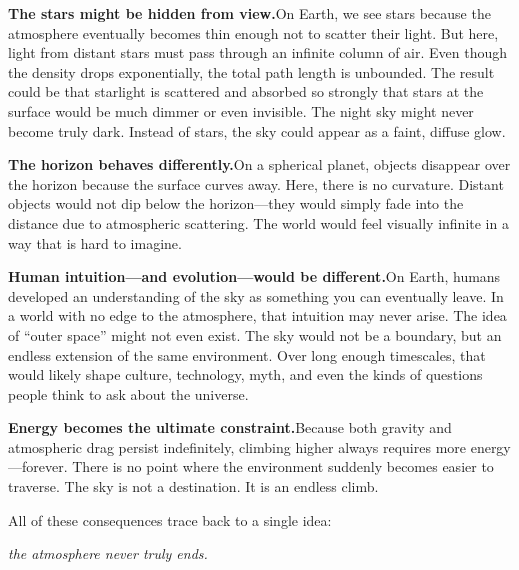 \documentclass[11pt, letterpaper]{article}
\begin{document}
\medskip

\textbf{The stars might be hidden from view.}\quad On Earth, we see stars because the atmosphere eventually becomes thin enough not to scatter their light. But here, light from distant stars must pass through an infinite column of air. Even though the density drops exponentially, the total path length is unbounded. The result could be that starlight is scattered and absorbed so strongly that stars at the surface would be much dimmer or even invisible. The night sky might never become truly dark. Instead of stars, the sky could appear as a faint, diffuse glow.

\medskip

\textbf{The horizon behaves differently.}\quad On a spherical planet, objects disappear over the horizon because the surface curves away. Here, there is no curvature. Distant objects would not dip below the horizon---they would simply fade into the distance due to atmospheric scattering. The world would feel visually infinite in a way that is hard to imagine.

\medskip

\textbf{Human intuition---and evolution---would be different.}\quad On Earth, humans developed an understanding of the sky as something you can eventually leave. In a world with no edge to the atmosphere, that intuition may never arise. The idea of ``outer space'' might not even exist. The sky would not be a boundary, but an endless extension of the same environment. Over long enough timescales, that would likely shape culture, technology, myth, and even the kinds of questions people think to ask about the universe.

\medskip

\textbf{Energy becomes the ultimate constraint.}\quad Because both gravity and atmospheric drag persist indefinitely, climbing higher always requires more energy---forever. There is no point where the environment suddenly becomes easier to traverse. The sky is not a destination. It is an endless climb.

\bigskip

All of these consequences trace back to a single idea:

\begin{center}
\textit{the atmosphere never truly ends.}
\end{center}

\end{document}
